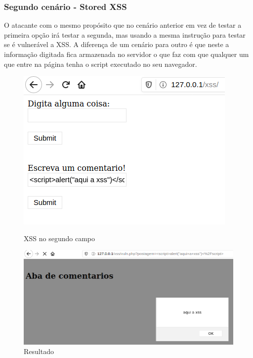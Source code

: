 \documentclass{report}
\begin{document}
\subsubsection{Segundo cenário - Stored XSS}

O atacante com o mesmo propósito que no cenário anterior em vez de testar a primeira opção irá testar a segunda, mas usando a mesma instrução para testar se é vulnerável a XSS. A diferença de um cenário para outro é que neste a informação digitada fica armazenada no servidor o que faz com que qualquer um que entre na página tenha o script executado no seu navegador.

\begin{figure}[!htb]
  \includegraphics[width=\linewidth]{imagessql/Fig13.png}
  \caption{XSS no segundo campo}\label{XSS no segundo campo}
\endminipage\hfill
{}
  \includegraphics[width=\linewidth]{imagessql/Fig14.png}
  \caption{Resultado}\label{Resultado}
\endminipage
\end{figure}
\end{document}
